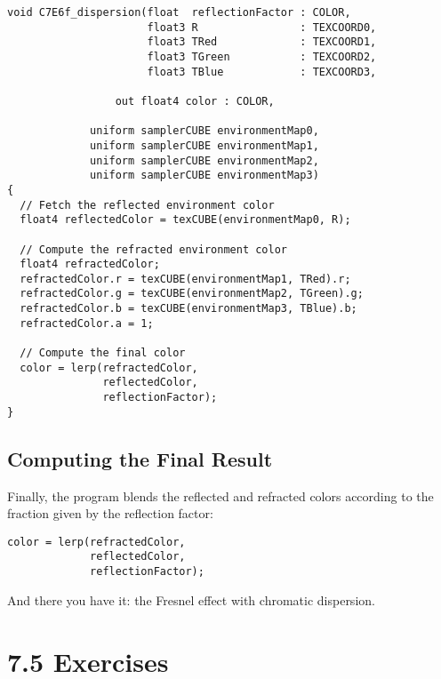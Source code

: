 \documentclass[../main.tex]{subfiles}
\begin{document}
\FloatBarrier
\begin{lstlisting}[caption=Example 7-6. The \textbf{C7E6f_dispersion} Fragment Program]
void C7E6f_dispersion(float  reflectionFactor : COLOR,
                      float3 R                : TEXCOORD0,
                      float3 TRed             : TEXCOORD1,
                      float3 TGreen           : TEXCOORD2,
                      float3 TBlue            : TEXCOORD3,

                 out float4 color : COLOR,

             uniform samplerCUBE environmentMap0,
             uniform samplerCUBE environmentMap1,
             uniform samplerCUBE environmentMap2,
             uniform samplerCUBE environmentMap3)
{
  // Fetch the reflected environment color
  float4 reflectedColor = texCUBE(environmentMap0, R);

  // Compute the refracted environment color
  float4 refractedColor;
  refractedColor.r = texCUBE(environmentMap1, TRed).r;
  refractedColor.g = texCUBE(environmentMap2, TGreen).g;
  refractedColor.b = texCUBE(environmentMap3, TBlue).b;
  refractedColor.a = 1;

  // Compute the final color
  color = lerp(refractedColor,
               reflectedColor,
               reflectionFactor);
}
\end{lstlisting}
\FloatBarrier

\subsection*{Computing the Final Result}

Finally, the program blends the reflected and refracted colors according to the fraction given by the reflection factor:

\FloatBarrier
\begin{lstlisting}
color = lerp(refractedColor,
             reflectedColor,
             reflectionFactor);
\end{lstlisting}
\FloatBarrier

And there you have it: the Fresnel effect with chromatic dispersion.

\section{7.5 Exercises}
\end{document}
